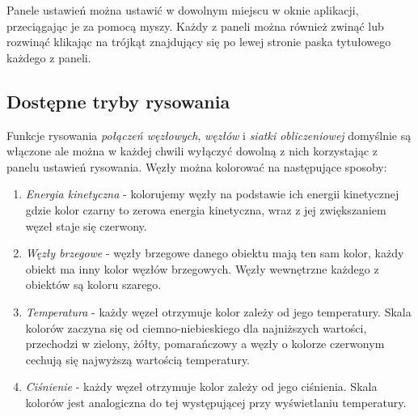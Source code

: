 \documentclass[12pt, letterpaper]{report}
\begin{document}
    Panele ustawień można ustawić w dowolnym miejscu w oknie aplikacji, przeciągając je za pomocą myszy.
    Każdy z paneli można również zwinąć lub rozwinąć klikając na trójkąt znajdujący się po lewej 
    stronie paska tytułowego każdego z paneli.

    \clearpage
    \subsection{Dostępne tryby rysowania}
    Funkcje rysowania \emph{połączeń węzłowych}, \emph{węzłów} i \emph{siatki obliczeniowej} domyślnie 
    są włączone ale można w każdej chwili wyłączyć dowolną z nich korzystając z panelu ustawień rysowania.
    Węzły można kolorować na następujące sposoby:

    \begin{enumerate}
        \item \emph{Energia kinetyczna} - kolorujemy węzły na podstawie ich energii kinetycznej 
        gdzie kolor czarny to zerowa energia kinetyczna, wraz z jej zwiększaniem węzeł staje się czerwony.

        \item \emph{Węzły brzegowe} - węzły brzegowe danego obiektu mają ten sam kolor,
        każdy obiekt ma inny kolor węzłów brzegowych. Węzły wewnętrzne każdego z obiektów są koloru szarego.

        \item \emph{Temperatura} - każdy węzeł otrzymuje kolor zależy od jego temperatury. 
        Skala kolorów zaczyna się od ciemno-niebieskiego dla najniższych wartości, 
        przechodzi w zielony, żółty, pomarańczowy a węzły o kolorze czerwonym
        cechują się najwyższą wartością temperatury.

        \item \emph{Ciśnienie} - każdy węzeł otrzymuje kolor zależy od jego ciśnienia. 
        Skala kolorów jest analogiczna do tej występującej przy wyświetlaniu temperatury.
    \end{enumerate}
\end{document}
